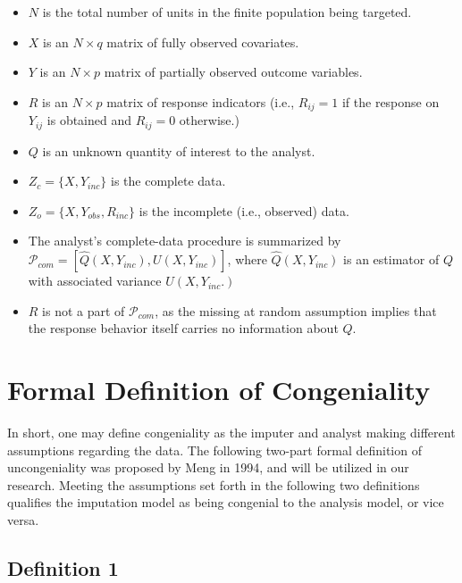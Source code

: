 \documentclass[
  letterpaper,
  DIV=11,
  numbers=noendperiod]{scrreprt}
\providecommand{\tightlist}{%
  \setlength{\itemsep}{0pt}\setlength{\parskip}{0pt}}\usepackage{longtable,booktabs,array}
\begin{document}
\begin{itemize}
\tightlist
\item
  \(N\) is the total number of units in the finite population being
  targeted.\\
\item
  \(X\) is an \(N \times q\) matrix of fully observed covariates.\\
\item
  \(Y\) is an \(N \times p\) matrix of partially observed outcome
  variables.\\
\item
  \(R\) is an \(N \times p\) matrix of response indicators (i.e.,
  \(R_{ij} = 1\) if the response on \(Y_{ij}\) is obtained and
  \(R_{ij} = 0\) otherwise.)\\
\item
  \(Q\) is an unknown quantity of interest to the analyst.
\item
  \(Z_c = \{X, Y_{inc}\}\) is the complete data.
\item
  \(Z_o = \{X, Y_{obs}, R_{inc}\}\) is the incomplete (i.e., observed)
  data.
\item
  The analyst's complete-data procedure is summarized by
  \(\mathscr{P}_{com} = [\hat{Q}(X, Y_{inc}), U(X, Y_{inc})]\), where
  \(\hat{Q}(X, Y_{inc})\) is an estimator of \(Q\) with associated
  variance \(U(X, Y_{inc}.)\)
\item
  \(R\) is not a part of \(\mathscr{P}_{com}\), as the missing at random
  assumption implies that the response behavior itself carries no
  information about \(Q\).
\end{itemize}

\hypertarget{formal-definition-of-congeniality}{%
\section*{Formal Definition of
Congeniality}\label{formal-definition-of-congeniality}}

In short, one may define congeniality as the imputer and analyst making
different assumptions regarding the data. The following two-part formal
definition of uncongeniality was proposed by Meng in 1994, and will be
utilized in our research. Meeting the assumptions set forth in the
following two definitions qualifies the imputation model as being
congenial to the analysis model, or vice versa.

\hypertarget{definition-1}{%
\subsection*{Definition 1}\label{definition-1}}
\end{document}
